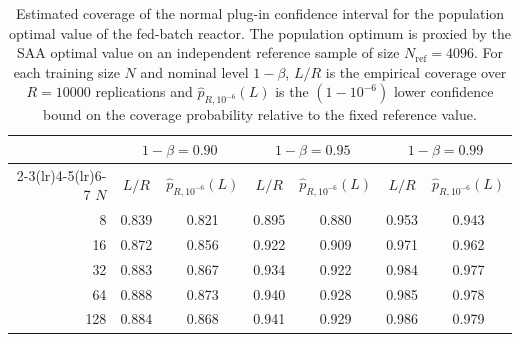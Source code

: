 \begin{table}[t]
  \centering
  \caption{Estimated coverage of the normal plug-in confidence interval for the population optimal value of the fed-batch reactor. The population optimum is proxied by the SAA optimal value on an independent reference sample of size $N_{\mathrm{ref}}=4096$. For each training size $N$ and nominal level $1-\beta$, $L/R$ is the empirical coverage over $R=10000$ replications and $\widehat p_{R,10^{-6}}(L)$ is the $(1-10^{-6})$ lower confidence bound on the coverage probability relative to the fixed reference value.}
  \begin{tabular}{rcccccc}
    \toprule
     & \multicolumn{2}{c}{$1-\beta = 0.90$} & \multicolumn{2}{c}{$1-\beta = 0.95$} & \multicolumn{2}{c}{$1-\beta = 0.99$} \\
    \cmidrule(lr){2-3}\cmidrule(lr){4-5}\cmidrule(lr){6-7}
    $N$ & $L/R$ & $\widehat p_{R,10^{-6}}(L)$ & $L/R$ & $\widehat p_{R,10^{-6}}(L)$ & $L/R$ & $\widehat p_{R,10^{-6}}(L)$ \\
    \midrule
    8 & 0.839 & 0.821 & 0.895 & 0.880 & 0.953 & 0.943 \\
    16 & 0.872 & 0.856 & 0.922 & 0.909 & 0.971 & 0.962 \\
    32 & 0.883 & 0.867 & 0.934 & 0.922 & 0.984 & 0.977 \\
    64 & 0.888 & 0.873 & 0.940 & 0.928 & 0.985 & 0.978 \\
    128 & 0.884 & 0.868 & 0.941 & 0.929 & 0.986 & 0.979 \\
    \bottomrule
  \end{tabular}
  \label{table:fed-batch-coverage}
\end{table}
